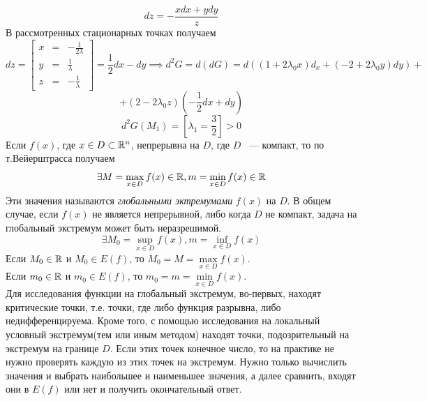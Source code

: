 \documentclass[../../main.tex]{subfiles}
\begin{document}
\begin{exmp}
	\[ dz = - \frac{xdx + ydy}{z}\]
	В рассмотренных стационарных точках получаем
	\[ dz = \left[
	\begin{array}{ccc}
	x & = & -\frac{1}{2\lambda} \\
	y & = & \frac{1}{\lambda} \\
	z & = & -\frac{1}{\lambda}
	\end{array}
	\right] = \frac{1}{2}dx - dy \implies d^2G = d\left(dG\right) = 
	d\left(\left(1 + 2\lambda_0x\right)d_x + \left(-2 
	+ 2\lambda_0y\right)dy\right) +\] 
	\[ + \left(2 - 2\lambda_0z\right)\left(-\frac{1}{2}dx + dy\right) \] 
	\[d^2G(M_1) = \left[\lambda_1 = \frac{3}{2}\right] > 0\]
	Если $f\left(x\right)$, где $x \in D \subset \mathbb{R}^n$, непрерывна на $D$,
	где $D$ ~--- компакт, то по т.Вейерштрасса получаем
	\[ \exists M = \max\limits_{x \in D} f(x) \in \mathbb{R},
	m = \min\limits_{x \in D} f(x) \in \mathbb{R} \]
	Эти значения называются \emph{глобальными эктремумами} $f(x)$ на $D$.
	В общем случае, если $f(x)$ не является непрерывной, либо когда $D$ 
	не компакт, задача на глобальный экстремум может быть неразрешимой.
	\[ \exists M_0 = \sup\limits_{x \in D} f(x),
	m = \inf\limits_{x \in D} f(x) \]
	Если $M_0 \in \mathbb{R}$ и $M_0 \in E(f)$, то $M_0 = M = 
	\max\limits_{x \in D} f(x)$. \\
	Если $m_0 \in \mathbb{R}$ и $m_0 \in E(f)$, то $m_0 = m = 
	\min\limits_{x \in D} f(x)$. \\
	Для исследования функции на глобальный экстремум, во-первых, 
	находят критические точки, т.е. точки, 
	где либо функция разрывна, либо недифференцируема. Кроме того, с помощью 
	исследования на локальный условный экстремум(тем или иным методом)
	находят точки, подозрительный на экстремум на границе $D$.
	Если этих точек конечное число, то на практике не нужно проверять каждую из 
	этих точек на экстремум.
	Нужно только вычислить значения и выбрать наибольшее и наименьшее значения, 
	а далее сравнить, входят они в $E(f)$ или нет и 
	получить окончательный ответ.
	\end{exmp}
	
\end{document}
